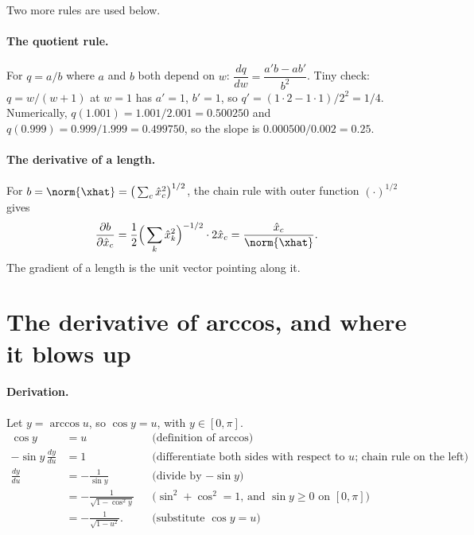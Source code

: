 Two more rules are used below.

\paragraph{The quotient rule.} For $q = a/b$ where $a$ and $b$ both depend
on $w$: $\dfrac{dq}{dw} = \dfrac{a'b - ab'}{b^2}$. Tiny check: $q = w/(w+1)$ at $w = 1$ has $a'
= 1$, $b' = 1$, so $q' = (1 \cdot 2 - 1 \cdot 1)/2^2 = 1/4$. Numerically, $q(1.001) =
1.001/2.001 = 0.500250$ and $q(0.999) = 0.999/1.999 = 0.499750$, so the slope is $0.000500/0.002
= 0.25$.

\paragraph{The derivative of a length.} For $b = \norm{\xhat} = \big(\sum_c
\hat{x}_c^2\big)^{1/2}$, the chain rule with outer function $(\cdot)^{1/2}$ gives
\[
\frac{\partial b}{\partial \hat{x}_c} = \frac{1}{2}\Big(\sum_k \hat{x}_k^2\Big)^{-1/2}\cdot 2\hat{x}_c = \frac{\hat{x}_c}{\norm{\xhat}}.
\]
The gradient of a length is the unit vector pointing along it.

\section{The derivative of arccos, and where it blows up}\label{sec:losses:arccos}

\paragraph{Derivation.} Let $y = \arccos u$, so $\cos y = u$, with $y \in [0, \pi]$.
\begin{align*}
\cos y &= u
  && \text{(definition of arccos)}\\
-\sin y \,\frac{dy}{du} &= 1
  && \text{(differentiate both sides with respect to $u$; chain rule on the left)}\\
\frac{dy}{du} &= -\frac{1}{\sin y}
  && \text{(divide by $-\sin y$)}\\
&= -\frac{1}{\sqrt{1 - \cos^2 y}}
  && \text{($\sin^2 + \cos^2 = 1$, and $\sin y \ge 0$ on $[0, \pi]$)}\\
&= -\frac{1}{\sqrt{1 - u^2}} .
  && \text{(substitute $\cos y = u$)}
\end{align*}

